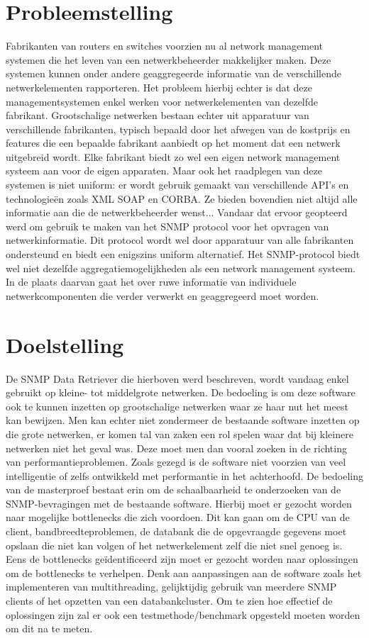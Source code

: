 \section{Probleemstelling} %
Fabrikanten van routers en switches voorzien nu al network management systemen die het leven van een netwerkbeheerder makkelijker maken.
Deze systemen kunnen onder andere geaggregeerde informatie van de verschillende netwerkelementen rapporteren.
Het probleem hierbij echter is dat deze managementsystemen enkel werken voor netwerkelementen van dezelfde fabrikant.
Grootschalige netwerken bestaan echter uit apparatuur van verschillende fabrikanten,
typisch bepaald door het afwegen van de kostprijs en features die een bepaalde fabrikant aanbiedt op het moment dat een netwerk uitgebreid wordt. %
Elke fabrikant biedt zo wel een eigen network management systeem aan voor de eigen apparaten.
Maar ook het raadplegen van deze systemen is niet uniform: er wordt gebruik gemaakt van verschillende API's en technologieën zoals XML SOAP en CORBA.
Ze bieden bovendien niet altijd alle informatie aan die de netwerkbeheerder wenst...
Vandaar dat ervoor geopteerd werd om gebruik te maken van het SNMP protocol voor het opvragen van netwerkinformatie.
Dit protocol wordt wel door apparatuur van alle fabrikanten ondersteund en biedt een enigszins uniform alternatief.
Het SNMP-protocol biedt wel niet dezelfde aggregatiemogelijkheden als een network management systeem.
In de plaats daarvan gaat het over ruwe informatie van individuele netwerkcomponenten die verder verwerkt en geaggregeerd moet worden.


\section{Doelstelling}
De SNMP Data Retriever die hierboven werd beschreven, wordt vandaag enkel gebruikt op kleine- tot middelgrote netwerken.
De bedoeling is om deze software ook te kunnen inzetten op grootschalige netwerken waar ze haar nut het meest kan bewijzen.
Men kan echter niet zondermeer de bestaande software inzetten op die grote netwerken, er komen tal van zaken een rol spelen
waar dat bij kleinere netwerken niet het geval was. Deze moet men dan vooral zoeken in de richting van performantieproblemen.
Zoals gezegd is de software niet voorzien van veel intelligentie of zelfs ontwikkeld met performantie in het achterhoofd.
De bedoeling van de masterproef bestaat erin om de schaalbaarheid te onderzoeken van de SNMP-bevragingen met de bestaande software.
Hierbij moet er gezocht worden naar mogelijke bottlenecks die zich voordoen.
Dit kan gaan om de CPU van de client, bandbreedteproblemen, de databank die de opgevraagde gegevens moet opslaan die niet kan volgen of
het netwerkelement zelf die niet snel genoeg is.
Eens de bottlenecks geïdentificeerd zijn moet er gezocht worden naar oplossingen om de bottlenecks te verhelpen.
Denk aan aanpassingen aan de software zoals het implementeren van multithreading, gelijktijdig gebruik van meerdere SNMP clients of
het opzetten van een databankcluster.
Om te zien hoe effectief de oplossingen zijn zal er ook een testmethode/benchmark opgesteld moeten worden om dit na te meten. 


